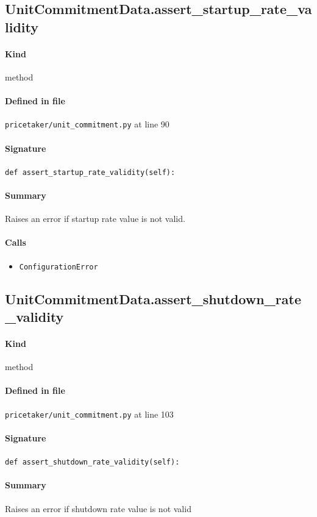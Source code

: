 \documentclass[11pt]{report}
\begin{document}
\subsection{UnitCommitmentData.assert\_startup\_rate\_validity}
\label{def:pricetaker-unit_commitment.py:UnitCommitmentData.assert_startup_rate_validity:L90}
\paragraph{Kind} method
\paragraph{Defined in file} \texttt{pricetaker/unit\_commitment.py} at line 90
\paragraph{Signature} \texttt{def assert\_startup\_rate\_validity(self):}
\paragraph{Summary} Raises an error if startup rate value is not valid.
\paragraph{Calls}
\begin{itemize}[leftmargin=*]
  \item \texttt{ConfigurationError}
\end{itemize}
\subsection{UnitCommitmentData.assert\_shutdown\_rate\_validity}
\label{def:pricetaker-unit_commitment.py:UnitCommitmentData.assert_shutdown_rate_validity:L103}
\paragraph{Kind} method
\paragraph{Defined in file} \texttt{pricetaker/unit\_commitment.py} at line 103
\paragraph{Signature} \texttt{def assert\_shutdown\_rate\_validity(self):}
\paragraph{Summary} Raises an error if shutdown rate value is not valid
\end{document}
